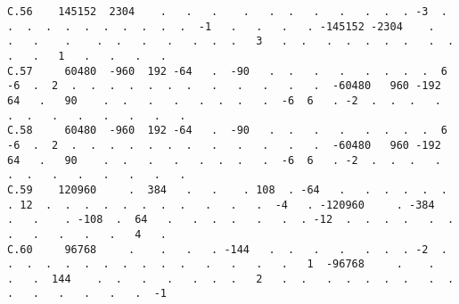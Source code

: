 \begin{verbatim}
C.56    145152  2304    .   .   .    .   .  .   .   .   .  .  . -3  .  .  .  .  .  .  .  .  .  .  .  -1   .   .   .   . -145152 -2304    .   .   .    .    .  .   .   .   .  .  .   3   .  .   .  .  .  .  .   .  .  .   .   1   .   .   .   .
C.57     60480  -960  192 -64   .  -90   .  .   .   .   .  .  .  .  6 -6  .  2  .  .  .  .  .  .  .   .   .   .   .   .  -60480   960 -192  64   .   90    .  .   .   .   .  .  .   .  -6  6   . -2  .  .  .   .  .  .   .   .   .   .   .   .
C.58     60480  -960  192 -64   .  -90   .  .   .   .   .  .  .  .  6 -6  .  2  .  .  .  .  .  .  .   .   .   .   .   .  -60480   960 -192  64   .   90    .  .   .   .   .  .  .   .  -6  6   . -2  .  .  .   .  .  .   .   .   .   .   .   .
C.59    120960     .  384   .   .    . 108  . -64   .   .  .  .  .  .  . 12  .  .  .  .  .  .  .  .   .   .   .  -4   . -120960     . -384   .   .    . -108  .  64   .   .  .  .   .   .  . -12  .  .  .  .   .  .  .   .   .   .   .   4   .
C.60     96768     .    .   .   . -144   .  .   .   .   .  .  . -2  .  .  .  .  .  .  .  .  .  .  .   .   .   .   .   1  -96768     .    .   .   .  144    .  .   .   .   .  .  .   2   .  .   .  .  .  .  .   .  .  .   .   .   .   .   .  -1

\end{verbatim}

